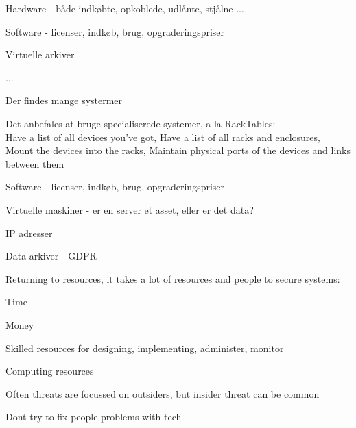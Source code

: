 \documentclass[Screen16to9,17pt]{foils}
\begin{document}
\begin{list2}
\item Hardware - både indkøbte, opkoblede, udlånte, stjålne ...
\item Software - licenser, indkøb, brug, opgraderingspriser
\item Virtuelle arkiver
\item ...
\end{list2}



\begin{list2}
\item Der findes mange systermer
\item Det anbefales at bruge specialiserede systemer, a la RackTables:\\
Have a list of all devices you've got,
Have a list of all racks and enclosures,
Mount the devices into the racks,
Maintain physical ports of the devices and links between them
\end{list2}



\begin{list2}
\item Software - licenser, indkøb, brug, opgraderingspriser
\item Virtuelle maskiner - er en server et asset, eller er det data?
\item IP adresser
\item Data arkiver - GDPR
\end{list2}




\begin{list1}
\item Returning to resources, it takes a lot of resources and people to secure systems:
\begin{list2}
\item Time
\item Money
\item Skilled resources for designing, implementing, administer, monitor
\item Computing resources
\end{list2}
\item Often threats are focussed on outsiders, but insider threat can be common
\item Dont try to fix people problems with tech
\end{list1}
\end{document}
